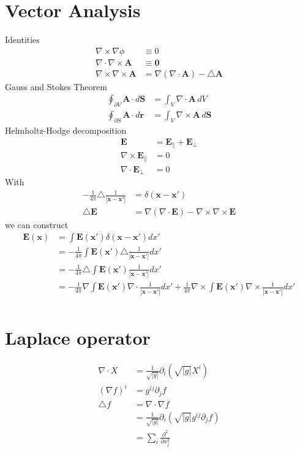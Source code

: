 \documentclass[10pt,a4paper]{book}
\theoremstyle{definition}
\begin{document}
\section{Vector Analysis}
Identities
\begin{align}
\nabla\times\nabla\phi&\equiv0\\
\nabla\cdot\nabla\times\mathbf{A}&\equiv\mathbf{0}\\
\nabla\times\nabla\times\mathbf{A}&=\nabla(\nabla\cdot\mathbf{A})-\triangle\mathbf{A}
\end{align}
Gauss and Stokes Theorem
\begin{align}
\oint_{\partial V}\mathbf{A}\cdot
d\mathbf{S}&=\int_V\nabla\cdot\mathbf{A}\,dV\\
\oint_{\partial S}\mathbf{A}\cdot
d\mathbf{r}&=\int_V\nabla\times\mathbf{A}\,d\mathbf{S}
\end{align}
Helmholtz-Hodge decomposition
\begin{align}
\mathbf{E}&=\mathbf{E}_\parallel+\mathbf{E}_\perp\\
\nabla\times\mathbf{E}_\parallel&=0\\
\nabla\cdot\mathbf{E}_\perp&=0
\end{align}
With
\begin{align}
-\frac{1}{4\pi}\triangle\frac{1}{|\mathbf{x}-\mathbf{x}'|}&=\delta(\mathbf{x}-\mathbf{x}')\\
\triangle\mathbf{E}&=\nabla(\nabla\cdot\mathbf{E})-\nabla\times\nabla\times\mathbf{E}
\end{align}
we can construct
\begin{align}
\mathbf{E}(\mathbf{x})
&=\int \mathbf{E}(\mathbf{x}') \delta(\mathbf{x}-\mathbf{x}')dx'\\
&=-\frac{1}{4\pi}\int \mathbf{E}(\mathbf{x}')\triangle\frac{1}{|\mathbf{x}-\mathbf{x}'|}dx'\\
&=-\frac{1}{4\pi}\triangle\int \mathbf{E}(\mathbf{x}')\frac{1}{|\mathbf{x}-\mathbf{x}'|}dx'\\
&=-\frac{1}{4\pi}\nabla\int \mathbf{E}(\mathbf{x}')\nabla\cdot\frac{1}{|\mathbf{x}-\mathbf{x}'|}dx'+\frac{1}{4\pi}\nabla\times\int \mathbf{E}(\mathbf{x}')\nabla\times\frac{1}{|\mathbf{x}-\mathbf{x}'|}dx'\\
\end{align}

\section{Laplace operator}
\begin{align}
    \nabla\cdot X&=\frac{1}{\sqrt{|g|}}\partial_i\left(\sqrt{|g|}X^i\right)\\
    (\nabla f)^i&=g^{ij}\partial_jf\\
    \triangle f &= \nabla\cdot\nabla f\\
    &=\frac{1}{\sqrt{|g|}}\partial_i\left(\sqrt{|g|} g^{ij}\partial_jf \right)\\
    &= \sum_i \frac{\partial^2}{\partial x_j^2}
\end{align}
\end{document}
